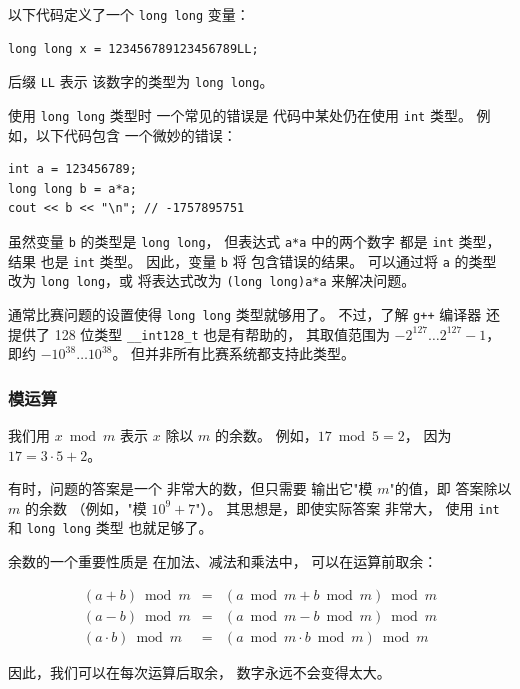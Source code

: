 以下代码定义了一个
\texttt{long long} 变量：
\begin{lstlisting}
long long x = 123456789123456789LL;
\end{lstlisting}
后缀 \texttt{LL} 表示
该数字的类型为 \texttt{long long}。

使用 \texttt{long long} 类型时
一个常见的错误是
代码中某处仍在使用 \texttt{int} 类型。
例如，以下代码包含
一个微妙的错误：

\begin{lstlisting}
int a = 123456789;
long long b = a*a;
cout << b << "\n"; // -1757895751
\end{lstlisting}

虽然变量 \texttt{b} 的类型是 \texttt{long long}，
但表达式 \texttt{a*a} 中的两个数字
都是 \texttt{int} 类型，结果
也是 \texttt{int} 类型。
因此，变量 \texttt{b} 将
包含错误的结果。
可以通过将 \texttt{a} 的类型
改为 \texttt{long long}，或
将表达式改为 \texttt{(long long)a*a} 来解决问题。

通常比赛问题的设置使得
\texttt{long long} 类型就够用了。
不过，了解 \texttt{g++} 编译器
还提供了 128 位类型 \texttt{\_\_int128\_t}
也是有帮助的，
其取值范围为
$-2^{127} \ldots 2^{127}-1$，即约 $-10^{38} \ldots 10^{38}$。
但并非所有比赛系统都支持此类型。

\subsubsection{模运算}


我们用 $x \bmod m$ 表示
$x$ 除以 $m$ 的余数。
例如，$17 \bmod 5 = 2$，
因为 $17 = 3 \cdot 5 + 2$。

有时，问题的答案是一个
非常大的数，但只需要
输出它"模 $m$"的值，即
答案除以 $m$ 的余数
（例如，"模 $10^9+7$"）。
其思想是，即使实际答案
非常大，
使用 \texttt{int} 和 \texttt{long long} 类型
也就足够了。

余数的一个重要性质是
在加法、减法和乘法中，
可以在运算前取余：

\[
\begin{array}{rcr}
(a+b) \bmod m & = & (a \bmod m + b \bmod m) \bmod m \\
(a-b) \bmod m & = & (a \bmod m - b \bmod m) \bmod m \\
(a \cdot b) \bmod m & = & (a \bmod m \cdot b \bmod m) \bmod m
\end{array}
\]

因此，我们可以在每次运算后取余，
数字永远不会变得太大。

